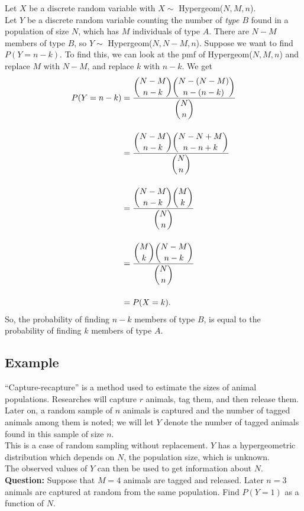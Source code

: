 \noindent Let $X$ be a discrete random variable with $X \sim$ Hypergeom($N,M,n$). \\

\noindent Let $Y$ be a discrete random variable counting the number of \textit{type $B$} found in a population of size $N$, which has $M$ individuals of type $A$. There are $N - M$ members of type $B$, so $Y \sim$ Hypergeom($N,N-M,n$). Suppose we want to find $P(Y = n - k)$. To find this, we can look at the pmf of Hypergeom($N,M,n$) and replace $M$ with $N - M$, and replace $k$ with $n - k$. We get
\begin{align*}
P(Y = n-k) & = \frac{\displaystyle{\binom{N - M}{n - k}\binom{N-(N - M)}{n-(n - k)}}}{\displaystyle{\binom{N}{n}}} \bsk
 		& = \frac{\displaystyle{\binom{N - M}{n - k}\binom{N-N + M}{n - n + k}}}{\displaystyle{\binom{N}{n}}} \bsk
 		& = \frac{\displaystyle{\binom{N - M}{n - k}\binom{M}{k}}}{\displaystyle{\binom{N}{n}}} \bsk
 		& = \frac{\displaystyle{\binom{M}{k}\binom{N - M}{n - k}}}{\displaystyle{\binom{N}{n}}} \bsk
 		& = P(X = k).
\end{align*}
So, the probability of finding $n - k$ members of type $B$, is equal to the probability of finding $k$ members of type $A$.

 
\subsection{Example} \label{unfinished2}
``Capture-recapture'' is a method used to estimate the sizes of animal populations. Researches will capture $r$ animals, tag them, and then release them. Later on, a random sample of $n$ animals is captured and the number of tagged animals among them is noted; we will let $Y$ denote the number of tagged animals found in this sample of size $n$. \\

\noindent This is a case of random sampling without replacement. $Y$ has a hypergeometric distribution which depends on $N$, the population size, which is unknown. \\

\noindent The observed values of $Y$ can then be used to get information about $N$. \\

\noindent \textbf{Question:} Suppose that $M = 4$ animals are tagged and released. Later $n = 3$ animals are captured at random from the same population. Find $P(Y=1)$ as a function of $N$.  \\

